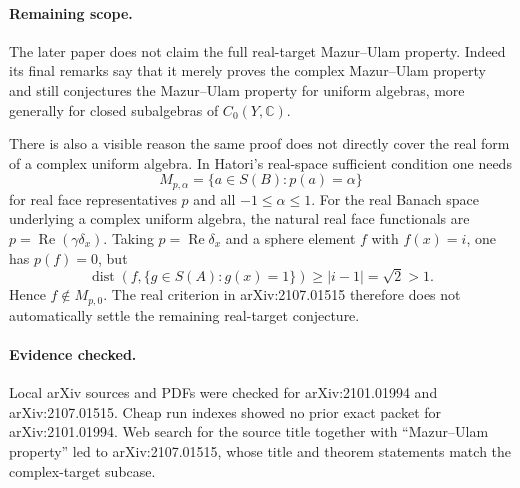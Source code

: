 \documentclass[11pt]{article}
\begin{document}
\paragraph{Remaining scope.}
The later paper does not claim the full real-target Mazur--Ulam property.
Indeed its final remarks say that it merely proves the complex Mazur--Ulam
property and still conjectures the Mazur--Ulam property for uniform algebras,
more generally for closed subalgebras of \(C_0(Y,\mathbb C)\).

There is also a visible reason the same proof does not directly cover the real
form of a complex uniform algebra.  In Hatori's real-space sufficient condition
one needs
\[
  M_{p,\alpha}=\{a\in S(B):p(a)=\alpha\}
\]
for real face representatives \(p\) and all \(-1\leq\alpha\leq 1\).  For the
real Banach space underlying a complex uniform algebra, the natural real face
functionals are \(p=\operatorname{Re}(\gamma\delta_x)\).  Taking \(p=\operatorname{Re}\delta_x\)
and a sphere element \(f\) with \(f(x)=i\), one has \(p(f)=0\), but
\[
  \operatorname{dist}(f,\{g\in S(A):g(x)=1\})\geq |i-1|=\sqrt2>1.
\]
Hence \(f\notin M_{p,0}\).  The real criterion in arXiv:2107.01515 therefore
does not automatically settle the remaining real-target conjecture.

\paragraph{Evidence checked.}
Local arXiv sources and PDFs were checked for arXiv:2101.01994 and
arXiv:2107.01515.  Cheap run indexes showed no prior exact packet for
arXiv:2101.01994.  Web search for the source title together with
``Mazur--Ulam property'' led to arXiv:2107.01515, whose title and theorem
statements match the complex-target subcase.
\end{document}
